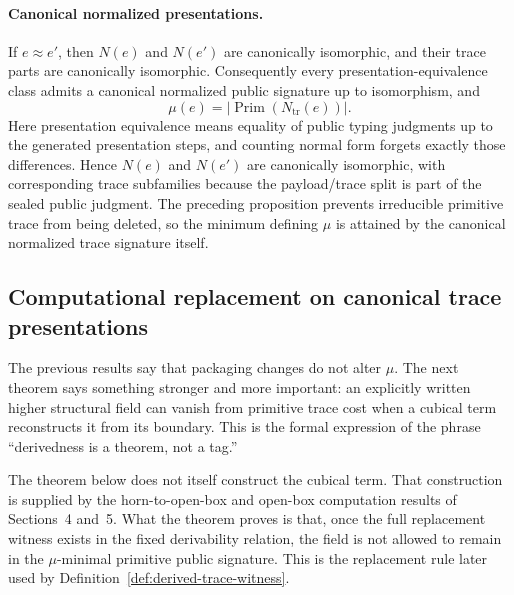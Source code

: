 \documentclass{lmcs}
\begin{document}
\paragraph{Canonical normalized presentations.}
If \(e\approx e'\), then \(N(e)\) and \(N(e')\) are canonically isomorphic, and their trace
parts are canonically isomorphic.  Consequently every presentation-equivalence class admits a
canonical normalized public signature up to isomorphism, and
\[
  \mu(e)=\left|\operatorname{Prim}(N_{\mathrm{tr}}(e))\right|.
\]
Here presentation equivalence means equality of public typing judgments up to the generated
presentation steps, and counting normal form forgets exactly those differences.  Hence
\(N(e)\) and \(N(e')\) are canonically isomorphic, with corresponding trace subfamilies because
the payload/trace split is part of the sealed public judgment.  The preceding proposition prevents
irreducible primitive trace from being deleted, so the minimum defining \(\mu\) is attained by
the canonical normalized trace signature itself.

\subsection{Computational replacement on canonical trace presentations}

The previous results say that packaging changes do not alter \(\mu\).  The next theorem says
something stronger and more important: an explicitly written higher structural field can
vanish from primitive trace cost when a cubical term reconstructs it from its boundary.
This is the formal expression of the phrase ``derivedness is a theorem, not a tag.''

The theorem below does not itself construct the cubical term.  That construction is supplied
by the horn-to-open-box and open-box computation results of Sections~4 and~5.  What the
theorem proves is that, once the full replacement witness exists in the fixed derivability
relation, the field is not allowed to remain in the \(\mu\)-minimal primitive public
signature.  This is the replacement rule later used by
Definition~\ref{def:derived-trace-witness}.
\end{document}
